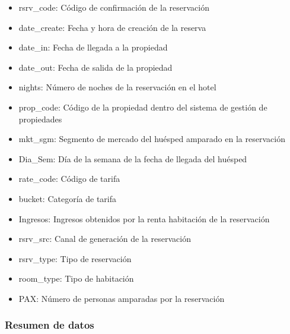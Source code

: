 \begin{itemize}
  \item rsrv\_code: Código de confirmación de la reservación
  \item date\_create: Fecha y hora de creación de la reserva
  \item date\_in: Fecha de llegada a la propiedad
  \item date\_out: Fecha de salida de la propiedad
  \item nights: Número de noches de la reservación en el hotel
  \item prop\_code: Código de la propiedad dentro del sistema de gestión de propiedades
  \item mkt\_sgm: Segmento de mercado del huésped amparado en la reservación
  \item Dia\_Sem: Día de la semana de la fecha de llegada del huésped
  \item rate\_code: Código de tarifa
  \item bucket: Categoría de tarifa
  \item Ingresos: Ingresos obtenidos por la renta habitación de la reservación
  \item rsrv\_src: Canal de generación de la reservación
  \item rsrv\_type: Tipo de reservación
  \item room\_type: Tipo de habitación
  \item PAX: Número de personas amparadas por la reservación
\end{itemize}

\subsubsection*{Resumen de datos}

